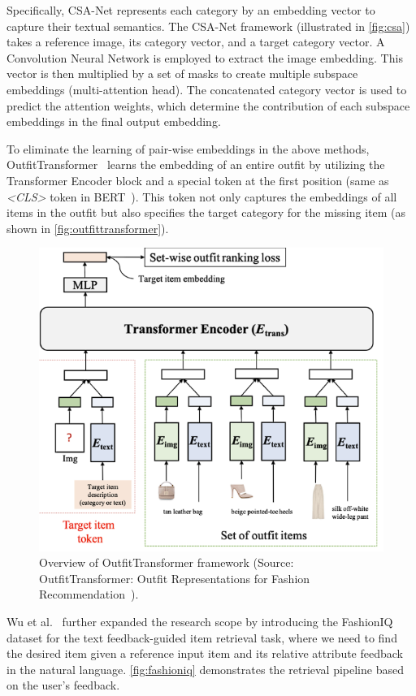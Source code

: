 Specifically, CSA-Net represents each category by an embedding vector to capture their textual semantics. The CSA-Net framework (illustrated in \autoref{fig:csa}) takes a reference image, its category vector, and a target category vector. A Convolution Neural Network is employed to extract the image embedding. This vector is then multiplied by a set of masks to create multiple subspace embeddings (multi-attention head). The concatenated category vector is used to predict the attention weights, which determine the contribution of each subspace embeddings in the final output embedding.

To eliminate the learning of pair-wise embeddings in the above methods, OutfitTransformer~\cite{Sarkar-CVPRW2022-OutfitTransformer} learns the embedding of an entire outfit by utilizing the Transformer Encoder block and a special token at the first position (same as \textit{<CLS>} token in BERT~\cite{Devlin-ArXiv2018-BERT}). This token not only captures the embeddings of all items in the outfit but also specifies the target category for the missing item (as shown in \autoref{fig:outfittransformer}).

\begin{figure}[h!]
    \centering
    \includegraphics[width=0.6\linewidth]{content/resources/images/literature-review/OutfitTransformers.PNG}
    \caption{Overview of OutfitTransformer framework (Source: OutfitTransformer: Outfit Representations for Fashion Recommendation~\cite{Sarkar-CVPRW2022-OutfitTransformer}).}
    \label{fig:outfittransformer}
\end{figure}

Wu et al.~\cite{Wu-CVPR2021-FashionIQ} further expanded the research scope by introducing the FashionIQ dataset for the text feedback-guided item retrieval task, where we need to find the desired item given a reference input item and its relative attribute feedback in the natural language. \autoref{fig:fashioniq} demonstrates the retrieval pipeline based on the user's feedback.

